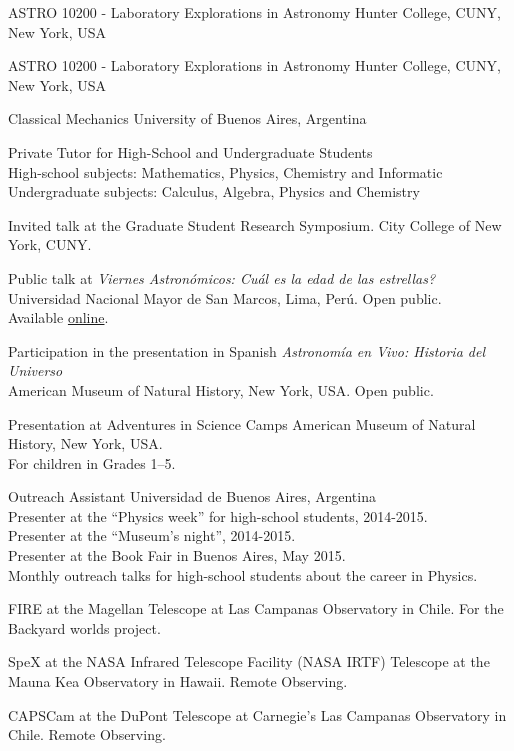 \documentclass[10pt]{cv}
\newcommand\tab[1][1cm]{\hspace*{#1}}
\begin{document}
\begin{llist}
ASTRO 10200 - Laboratory Explorations in Astronomy
Hunter College, CUNY, New York, USA


ASTRO 10200 - Laboratory Explorations in Astronomy
Hunter College, CUNY, New York, USA


Classical Mechanics
University of Buenos Aires, Argentina


Private Tutor 
for High-School and Undergraduate Students\\
High-school subjects: Mathematics, Physics, Chemistry and Informatic\\
Undergraduate subjects: Calculus, Algebra, Physics and Chemistry 


Invited talk at the Graduate Student Research Symposium.	
City College of New York, CUNY.	

Public talk at \textit{Viernes Astron\'omicos: Cu\'al es la edad de las estrellas?}
Universidad Nacional Mayor de San Marcos, Lima, Per\'u. Open public.\\
Available \href{https://www.youtube.com/watch?v=QOlgG1b41hU&ab_channel=AstronomySanMarcos}{online}.

Participation in the presentation in Spanish
\textit{Astronom\'ia en Vivo: Historia del Universo}\\
American Museum of Natural History, New York, USA. Open public.

Presentation at Adventures in Science Camps
American Museum of Natural History, New York, USA. \\
For children in Grades 1--5.

Outreach Assistant
Universidad de Buenos Aires, Argentina\\
\tab Presenter at the ``Physics week'' for high-school students, 2014-2015.\\
\tab Presenter at the ``­Museum's night'', 2014-2015.\\
\tab Presenter at the Book Fair in Buenos Aires, May 2015.\\
\tab Monthly outreach talks for high-school students about the career in Physics.


FIRE at the Magellan Telescope at Las Campanas Observatory
 in Chile. For the Backyard worlds project. 

SpeX at the NASA Infrared Telescope Facility (NASA IRTF) 	
Telescope at the Mauna Kea Observatory in Hawaii. Remote Observing. 

CAPSCam at the DuPont Telescope	
at Carnegie's Las Campanas Observatory in Chile. Remote Observing.


\end{llist}
\end{document}
